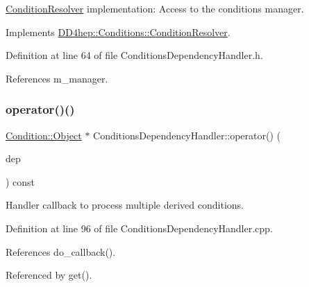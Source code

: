 \hyperlink{class_d_d4hep_1_1_conditions_1_1_condition_resolver}{Condition\+Resolver} implementation\+: Access to the conditions manager. 



Implements \hyperlink{class_d_d4hep_1_1_conditions_1_1_condition_resolver_ab8c95a13c7c20b35ab746e6fcc8c420f}{D\+D4hep\+::\+Conditions\+::\+Condition\+Resolver}.



Definition at line 64 of file Conditions\+Dependency\+Handler.\+h.



References m\+\_\+manager.

\hypertarget{class_d_d4hep_1_1_conditions_1_1_conditions_dependency_handler_ad4230e80365f9fbd75077ca3bf0be23c}{}\label{class_d_d4hep_1_1_conditions_1_1_conditions_dependency_handler_ad4230e80365f9fbd75077ca3bf0be23c} 
\subsubsection{\texorpdfstring{operator()()}{operator()()}}
{\footnotesize\ttfamily \hyperlink{class_d_d4hep_1_1_conditions_1_1_condition_a6fc8dae0dad41db6a237920c85f8a55d}{Condition\+::\+Object} $\ast$ Conditions\+Dependency\+Handler\+::operator() (\begin{DoxyParamCaption}\item[{const \hyperlink{class_d_d4hep_1_1_conditions_1_1_condition_dependency}{Condition\+Dependency} $\ast$}]{dep }\end{DoxyParamCaption}) const}



Handler callback to process multiple derived conditions. 



Definition at line 96 of file Conditions\+Dependency\+Handler.\+cpp.



References do\+\_\+callback().



Referenced by get().

\hypertarget{class_d_d4hep_1_1_conditions_1_1_conditions_dependency_handler_a65870f83dc56b87f3f2056b37ed85e2f}{}\label{class_d_d4hep_1_1_conditions_1_1_conditions_dependency_handler_a65870f83dc56b87f3f2056b37ed85e2f} 
